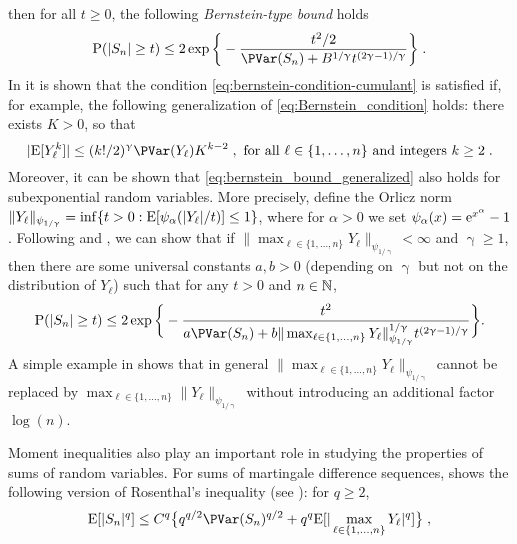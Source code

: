 then for all $t \geq 0$, the following \emph{Bernstein-type bound} holds
\begin{equation}
\label{eq: Bernstein type bound}
 \PP(|S_n| \geq t) \le 2 \exp \bigg \{ -\frac{t^2/2}{\PVar(S_n) + B^{1/\upgamma} t^{(2\upgamma - 1)/\upgamma}} \bigg \} \eqsp.
\end{equation}
In \cite[Theorem 3.1]{saulis:statulevicius:1991} it is shown that the condition \eqref{eq:bernstein-condition-cumulant} is satisfied if, for example, the following generalization of \eqref{eq:Bernstein_condition} holds: there exists $K > 0 $, so that
\begin{equation}
\label{eq:bernstein_bound_generalized}
|\PE[Y_{\ell}^k]|  \leq (k!/2)^{\upgamma} \PVar(Y_\ell) K^{k-2}\eqsp, \text{ for all } \ell \in\{ 1, \ldots, n\} \text{ and  integers } k \geq 2\eqsp.
\end{equation}
Moreover, it can be shown that \eqref{eq:bernstein_bound_generalized} also holds for subexponential random variables. More precisely, define the Orlicz norm $\| Y_{\ell} \|_{\psi_{1/\upgamma}} = \inf\{t > 0: \mathrm{E} [\psi_\alpha(|Y_{\ell}|/t)] \le 1\}$, where for $\alpha > 0$ we set $\psi_\alpha(x) = \mathrm{e}^{x^\alpha} - 1$.
Following \cite{Adamczak2008} and \cite{Lecue2012}, we can show that if $\|\max_{\ell \in \{1,\dots,n\}} Y_\ell\|_{\psi_{1/\upgamma}} < \infty$ and $\upgamma \geq 1$, then there are some universal constants $a, b > 0$ (depending on $\upgamma$ but not on the distribution of $Y_{\ell}$) such that for any $t > 0$ and $n \in \mathbb{N}$,
\begin{equation}
\label{eq:gene_Bernstein type bound}
\PP( |S_n| \geq t) \le 2 \exp \bigg \{-\frac{t^2}{a \PVar(S_n) + b  \| \max_{\ell \in \{1,\dots,n\}} Y_\ell \|_{\psi_{1/\upgamma}}^{1/\upgamma} t^{(2\upgamma -1)/\upgamma} } \bigg \}.
\end{equation}
A simple example in \cite{Adamczak2008} shows that in general $\| \max_{\ell \in \{1,\dots,n\}} Y_\ell \|_{\psi_{1/\upgamma}}$ cannot be replaced by $\max_{ \ell \in \{1,\dots,n\}} \|Y_\ell \|_{\psi_{1/\upgamma}}$ without introducing an additional factor $\log(n)$.
\par 
Moment inequalities also play an important role in studying the properties of sums of random variables. For sums of martingale difference sequences, \cite{pinelis_1994} shows the following version of Rosenthal's inequality (see \cite{Rosenthal1970}): for $q \geq 2$,
\begin{equation}
\label{eq:ros_independent_pinelis}
    \PE[|S_n|^{q}] \le C^q \bigl\{ q^{q/2} \PVar(S_n)^{q/2} +  q^q \PE[|\max_{\ell \in \{1,\dots,n\}} Y_{\ell}|^q]\bigr\} \eqsp,
\end{equation}
